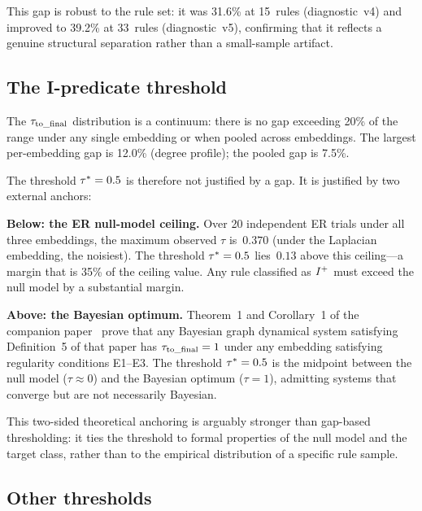\documentclass{../shared/primo}
\begin{document}
This gap is robust to the rule set: it was 31.6\% at 15~rules (diagnostic~v4) and improved to 39.2\% at 33~rules (diagnostic~v5), confirming that it reflects a genuine structural separation rather than a small-sample artifact.

\subsection{The I-predicate threshold}
\label{sec:ithreshold}

The $\tau_{\mathrm{to\_final}}$ distribution is a continuum: there is no gap exceeding 20\% of the range under any single embedding or when pooled across embeddings. The largest per-embedding gap is 12.0\% (degree profile); the pooled gap is 7.5\%.

The threshold $\tau^* = 0.5$ is therefore not justified by a gap. It is justified by two external anchors:

\textbf{Below: the ER null-model ceiling.} Over 20 independent ER trials under all three embeddings, the maximum observed $\tau$ is~$0.370$ (under the Laplacian embedding, the noisiest). The threshold $\tau^* = 0.5$ lies~$0.13$ above this ceiling---a margin that is 35\% of the ceiling value. Any rule classified as $I\textsuperscript{+}$ must exceed the null model by a substantial margin.

\textbf{Above: the Bayesian optimum.} Theorem~1 and Corollary~1 of the companion paper~\cite{kowalczyk2026bayesian} prove that any Bayesian graph dynamical system satisfying Definition~5 of that paper has $\tau_{\mathrm{to\_final}} = 1$ under any embedding satisfying regularity conditions E1--E3. The threshold $\tau^* = 0.5$ is the midpoint between the null model ($\tau \approx 0$) and the Bayesian optimum ($\tau = 1$), admitting systems that converge but are not necessarily Bayesian.

This two-sided theoretical anchoring is arguably stronger than gap-based thresholding: it ties the threshold to formal properties of the null model and the target class, rather than to the empirical distribution of a specific rule sample.

\subsection{Other thresholds}
\end{document}
